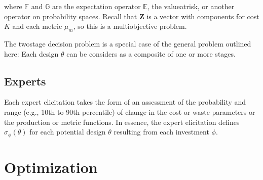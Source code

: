 \documentclass[letterpaper,10pt,english]{sphinxmanual}
\begin{document}
\sphinxAtStartPar
where \(\mathbb{F}\) and \(\mathbb{G}\) are the expectation
operator \(\mathbb{E}\), the value\sphinxhyphen{}at\sphinxhyphen{}risk, or another operator on
probability spaces. Recall that \(\mathbf{Z}\) is a vector with
components for cost \(K\) and each metric \(\mu_m\), so this is
a multi\sphinxhyphen{}objective problem.

\sphinxAtStartPar
The two\sphinxhyphen{}stage decision problem is a special case of the general problem
outlined here: Each design \(\theta\) can be considers as a
composite of one or more stages.


\section{Experts}
\label{\detokenize{formulation:experts}}
\sphinxAtStartPar
Each expert elicitation takes the form of an assessment of the
probability and range (e.g., 10th to 90th percentile) of change in the
cost or waste parameters or the production or metric functions. In
essence, the expert elicitation defines \(\sigma_\phi(\theta)\) for
each potential design \(\theta\) resulting from each investment \(\phi\).

\sphinxstepscope


\chapter{Optimization}
\label{\detokenize{optimizers:optimization}}\label{\detokenize{optimizers:sec-optimizers}}\label{\detokenize{optimizers::doc}}
\end{document}
